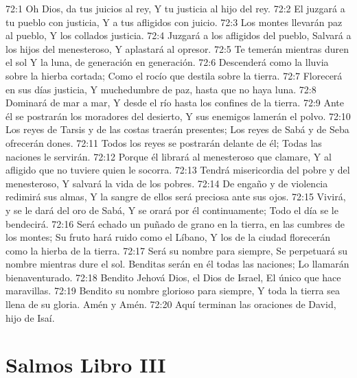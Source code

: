 72:1 Oh Dios, da tus juicios al rey, 
Y tu justicia al hijo del rey. 
72:2 El juzgará a tu pueblo con justicia, 
Y a tus afligidos con juicio. 
72:3 Los montes llevarán paz al pueblo, 
Y los collados justicia. 
72:4 Juzgará a los afligidos del pueblo, 
Salvará a los hijos del menesteroso, 
Y aplastará al opresor. 
72:5 Te temerán mientras duren el sol 
Y la luna, de generación en generación. 
72:6 Descenderá como la lluvia sobre la hierba cortada; 
Como el rocío que destila sobre la tierra. 
72:7 Florecerá en sus días justicia, 
Y muchedumbre de paz, hasta que no haya luna. 
72:8 Dominará de mar a mar, 
Y desde el río hasta los confines de la tierra.  
72:9 Ante él se postrarán los moradores del desierto, 
Y sus enemigos lamerán el polvo. 
72:10 Los reyes de Tarsis y de las costas traerán presentes; 
Los reyes de Sabá y de Seba ofrecerán dones. 
72:11 Todos los reyes se postrarán delante de él; 
Todas las naciones le servirán. 
72:12 Porque él librará al menesteroso que clamare, 
Y al afligido que no tuviere quien le socorra. 
72:13 Tendrá misericordia del pobre y del menesteroso, 
Y salvará la vida de los pobres. 
72:14 De engaño y de violencia redimirá sus almas, 
Y la sangre de ellos será preciosa ante sus ojos. 
72:15 Vivirá, y se le dará del oro de Sabá, 
Y se orará por él continuamente; 
Todo el día se le bendecirá. 
72:16 Será echado un puñado de grano en la tierra, en las cumbres de los montes; 
Su fruto hará ruido como el Líbano, 
Y los de la ciudad florecerán como la hierba de la tierra. 
72:17 Será su nombre para siempre, 
Se perpetuará su nombre mientras dure el sol. 
Benditas serán en él todas las naciones; 
Lo llamarán bienaventurado. 
72:18 Bendito Jehová Dios, el Dios de Israel, 
El único que hace maravillas. 
72:19 Bendito su nombre glorioso para siempre, 
Y toda la tierra sea llena de su gloria. 
Amén y Amén. 
72:20 Aquí terminan las oraciones de David, hijo de Isaí.


\chapter{Salmos Libro III}



